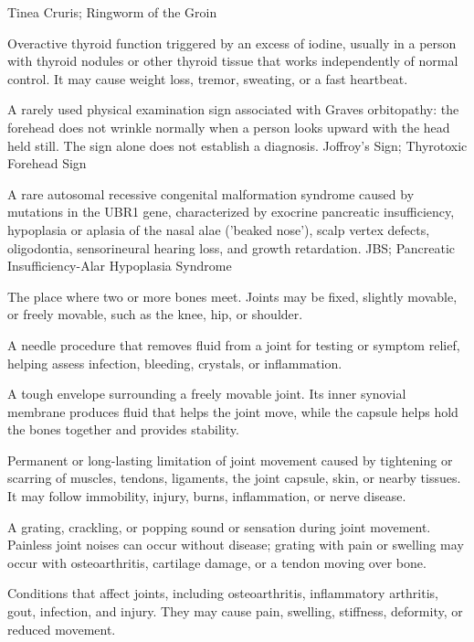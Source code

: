 \synonyms
Tinea Cruris; Ringworm of the Groin

 Overactive thyroid function triggered by an excess of iodine, usually in a person with thyroid nodules or other thyroid tissue that works independently of normal control. It may cause weight loss, tremor, sweating, or a fast heartbeat.

 A rarely used physical examination sign associated with Graves orbitopathy: the forehead does not wrinkle normally when a person looks upward with the head held still. The sign alone does not establish a diagnosis.
\synonyms
Joffroy's Sign; Thyrotoxic Forehead Sign

 A rare autosomal recessive congenital malformation syndrome caused by mutations in the UBR1 gene, characterized by exocrine pancreatic insufficiency, hypoplasia or aplasia of the nasal alae ('beaked nose'), scalp vertex defects, oligodontia, sensorineural hearing loss, and growth retardation.
\synonyms
JBS; Pancreatic Insufficiency-Alar Hypoplasia Syndrome

 The place where two or more bones meet. Joints may be fixed, slightly movable, or freely movable, such as the knee, hip, or shoulder.

 A needle procedure that removes fluid from a joint for testing or symptom relief, helping assess infection, bleeding, crystals, or inflammation.

 A tough envelope surrounding a freely movable joint. Its inner synovial membrane produces fluid that helps the joint move, while the capsule helps hold the bones together and provides stability.

 Permanent or long-lasting limitation of joint movement caused by tightening or scarring of muscles, tendons, ligaments, the joint capsule, skin, or nearby tissues. It may follow immobility, injury, burns, inflammation, or nerve disease.

 A grating, crackling, or popping sound or sensation during joint movement. Painless joint noises can occur without disease; grating with pain or swelling may occur with osteoarthritis, cartilage damage, or a tendon moving over bone.

 Conditions that affect joints, including osteoarthritis, inflammatory arthritis, gout, infection, and injury. They may cause pain, swelling, stiffness, deformity, or reduced movement.


